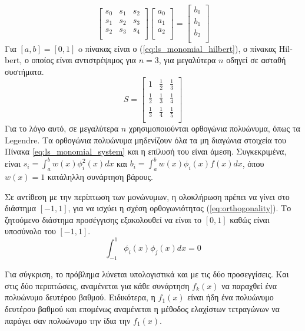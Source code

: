 \documentclass[assignment3.tex]{subfiles}
\begin{document}
\begin{equation}
\left[
\begin{matrix}
s_0 & s_1 & s_2 \\
s_1 & s_2 & s_3 \\
s_2 & s_3 & s_4 \\
\end{matrix}
\right]
\left[
\begin{matrix}
a_0 \\
a_1 \\
a_2 \\
\end{matrix}
\right]=
\left[
\begin{matrix}
b_0 \\
b_1 \\
b_2 \\
\end{matrix}
\right]
\label{eq:ls_monomial_system}
\end{equation}
Για $[a,b]=[0,1]$ o πίνακας είναι ο (\ref{eq:ls_monomial_hilbert}), ο πίνακας \textlatin{Hilbert}, ο οποίος είναι αντιστρέψιμος για $n=3$, για μεγαλύτερα $n$ οδηγεί σε ασταθή συστήματα.
\begin{equation}
S=\left[
\begin{matrix}
1 & \frac{1}{2} & \frac{1}{3} \\
\frac{1}{2} & \frac{1}{3} & \frac{1}{4} \\
\frac{1}{3} & \frac{1}{4} & \frac{1}{5} \\
\end{matrix}
\right]
\label{eq:ls_monomial_hilbert}
\end{equation}
Για το λόγο αυτό, σε μεγαλύτερα $n$ χρησιμοποιούνται ορθογώνια πολυώνυμα, όπως τα \textlatin{Legendre}. Τα ορθογώνια πολυώνυμα μηδενίζουν όλα τα μη διαγώνια στοιχεία του Πίνακα \ref{eq:ls_monomial_system} και η επίλυσή του είναι άμεση.
Συγκεκριμένα, είναι $s_i = \int_{a}^{b}w(x)\phi_i^2(x)dx$ και $b_i=\int_{a}^{b}w(x)\phi_i(x) f(x)dx$, όπου $w(x)=1$ κατάληλλη συνάρτηση βάρους. 

Σε αντίθεση με την περίπτωση των μονώνυμων, η ολοκλήρωση πρέπει να γίνει στο διάστημα $[-1,1]$, για να ισχύει η σχέση ορθογωνιότητας (\ref{eq:orthogonality}). Το ζητούμενο διάστημα προσέγγισης εξακολουθεί να είναι το $[0,1]$ καθώς είναι υποσύνολο του $[-1,1]$.
\begin{equation}
\int_{-1}^{1}\phi_i(x)\phi_j(x)dx=0
\label{eq:orthogonality}
\end{equation}

Για σύγκριση, το πρόβλημα λύνεται υπολογιστικά και με τις δύο προσεγγίσεις. Και στις δύο περιπτώσεις, αναμένεται για κάθε συνάρτηση $f_k(x)$ να παραχθεί ένα πολυώνυμο δευτέρου βαθμού. Ειδικότερα, η $f_1(x)$ είναι ήδη ένα πολυώνυμο δευτέρου βαθμού και επομένως αναμένεται η μέθοδος ελαχίστων τετραγώνων να παράγει σαν πολυώνυμο την ίδια την $f_1(x)$.
\end{document}
